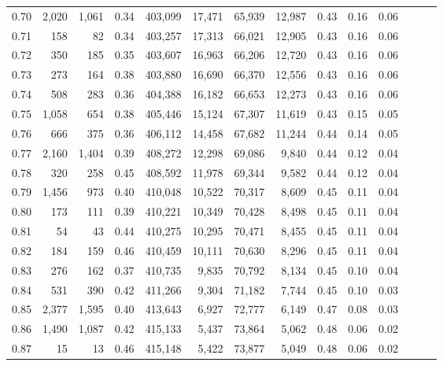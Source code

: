 \begin{tabular}{rrrrrrrrrrrrrr}
0.70 &   2,020 &  1,061 &  0.34 &  403,099 &   17,471 &  65,939 &  12,987 &  0.43 &  0.16 &      0.06 \\
0.71 &     158 &     82 &  0.34 &  403,257 &   17,313 &  66,021 &  12,905 &  0.43 &  0.16 &      0.06 \\
0.72 &     350 &    185 &  0.35 &  403,607 &   16,963 &  66,206 &  12,720 &  0.43 &  0.16 &      0.06 \\
0.73 &     273 &    164 &  0.38 &  403,880 &   16,690 &  66,370 &  12,556 &  0.43 &  0.16 &      0.06 \\
0.74 &     508 &    283 &  0.36 &  404,388 &   16,182 &  66,653 &  12,273 &  0.43 &  0.16 &      0.06 \\
0.75 &   1,058 &    654 &  0.38 &  405,446 &   15,124 &  67,307 &  11,619 &  0.43 &  0.15 &      0.05 \\
0.76 &     666 &    375 &  0.36 &  406,112 &   14,458 &  67,682 &  11,244 &  0.44 &  0.14 &      0.05 \\
0.77 &   2,160 &  1,404 &  0.39 &  408,272 &   12,298 &  69,086 &   9,840 &  0.44 &  0.12 &      0.04 \\
0.78 &     320 &    258 &  0.45 &  408,592 &   11,978 &  69,344 &   9,582 &  0.44 &  0.12 &      0.04 \\
0.79 &   1,456 &    973 &  0.40 &  410,048 &   10,522 &  70,317 &   8,609 &  0.45 &  0.11 &      0.04 \\
0.80 &     173 &    111 &  0.39 &  410,221 &   10,349 &  70,428 &   8,498 &  0.45 &  0.11 &      0.04 \\
0.81 &      54 &     43 &  0.44 &  410,275 &   10,295 &  70,471 &   8,455 &  0.45 &  0.11 &      0.04 \\
0.82 &     184 &    159 &  0.46 &  410,459 &   10,111 &  70,630 &   8,296 &  0.45 &  0.11 &      0.04 \\
0.83 &     276 &    162 &  0.37 &  410,735 &    9,835 &  70,792 &   8,134 &  0.45 &  0.10 &      0.04 \\
0.84 &     531 &    390 &  0.42 &  411,266 &    9,304 &  71,182 &   7,744 &  0.45 &  0.10 &      0.03 \\
0.85 &   2,377 &  1,595 &  0.40 &  413,643 &    6,927 &  72,777 &   6,149 &  0.47 &  0.08 &      0.03 \\
0.86 &   1,490 &  1,087 &  0.42 &  415,133 &    5,437 &  73,864 &   5,062 &  0.48 &  0.06 &      0.02 \\
0.87 &      15 &     13 &  0.46 &  415,148 &    5,422 &  73,877 &   5,049 &  0.48 &  0.06 &      0.02 \\

\end{tabular}
